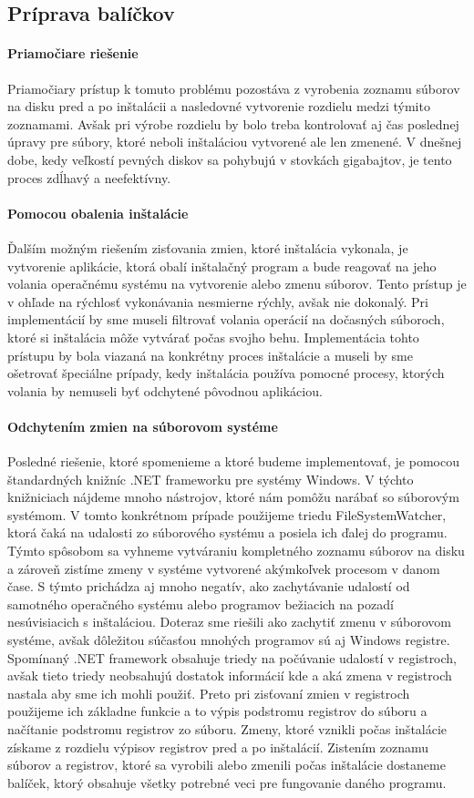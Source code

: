 \subsection{Príprava balíčkov}

\paragraph{Priamočiare riešenie}
Priamočiary prístup k tomuto problému pozostáva z vyrobenia zoznamu súborov na disku pred a po inštalácii a nasledovné vytvorenie rozdielu medzi týmito zoznamami. Avšak pri výrobe rozdielu by bolo treba kontrolovať aj čas poslednej úpravy pre súbory, ktoré neboli inštaláciou vytvorené ale len zmenené. V dnešnej dobe, kedy veľkostí pevných diskov sa pohybujú v stovkách gigabajtov, je tento proces zdĺhavý a neefektívny. 
\paragraph{Pomocou obalenia inštalácie}
Ďalším možným riešením zisťovania zmien, ktoré inštalácia vykonala, je vytvorenie aplikácie, ktorá obalí inštalačný program a bude reagovať na jeho volania operačnému systému na vytvorenie alebo zmenu súborov. Tento prístup je v ohľade na rýchlosť vykonávania nesmierne rýchly, avšak nie dokonalý. Pri implementácií by sme museli filtrovať volania operácií na dočasných súboroch, ktoré si inštalácia môže vytvárať počas svojho behu. Implementácia tohto prístupu by bola viazaná na konkrétny proces inštalácie a museli by sme ošetrovať špeciálne prípady, kedy inštalácia používa pomocné procesy, ktorých volania by nemuseli byť odchytené pôvodnou aplikáciou. 
\paragraph{Odchytením zmien na súborovom systéme}
Posledné riešenie, ktoré spomenieme a ktoré budeme implementovať, je pomocou štandardných knižníc .NET frameworku pre systémy Windows. V týchto knižniciach nájdeme mnoho nástrojov, ktoré nám pomôžu narábať so súborovým systémom. V tomto konkrétnom prípade použijeme triedu FileSystemWatcher, ktorá čaká na udalosti zo súborového systému a posiela ich ďalej do programu. Týmto spôsobom sa vyhneme vytváraniu kompletného zoznamu súborov na disku a zároveň zistíme zmeny v systéme vytvorené akýmkoľvek procesom v danom čase. S týmto prichádza aj mnoho negatív, ako zachytávanie udalostí od samotného operačného systému alebo programov bežiacich na pozadí nesúvisiacich s inštaláciou. Doteraz sme riešili ako zachytiť zmenu v súborovom systéme, avšak dôležitou súčasťou mnohých programov sú aj Windows registre. Spomínaný .NET framework obsahuje triedy na počúvanie udalostí v registroch, avšak tieto triedy neobsahujú dostatok informácií kde a aká zmena v registroch nastala aby sme ich mohli použiť. Preto pri zisťovaní zmien v registroch použijeme ich základne funkcie a to výpis podstromu  registrov do súboru a načítanie podstromu registrov zo súboru. Zmeny, ktoré vznikli počas inštalácie získame z rozdielu výpisov registrov pred a po inštalácií. Zistením zoznamu súborov a registrov, ktoré sa vyrobili alebo zmenili počas inštalácie dostaneme balíček, ktorý obsahuje všetky potrebné veci pre fungovanie daného programu.

